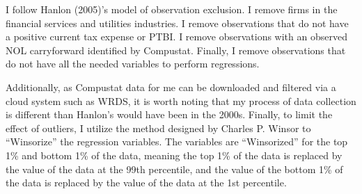 \documentclass[12pt]{article}
\begin{document}
I follow Hanlon (2005)’s model of observation exclusion. I remove firms in the financial services and utilities industries. I remove observations that do not have a positive current tax expense or PTBI. I remove observations with an observed NOL carryforward identified by Compustat. Finally, I remove observations that do not have all the needed variables to perform regressions.

Additionally, as Compustat data for me can be downloaded and filtered via a cloud system such as WRDS, it is worth noting that my process of data collection is different than Hanlon’s would have been in the 2000s. Finally, to limit the effect of outliers, I utilize the method designed by Charles P. Winsor to “Winsorize” the regression variables. The variables are “Winsorized” for the top 1\% and bottom 1\% of the data, meaning the top 1\% of the data is replaced by the value of the data at the 99th percentile, and the value of the bottom 1\% of the data is replaced by the value of the data at the 1st percentile.
\end{document}
